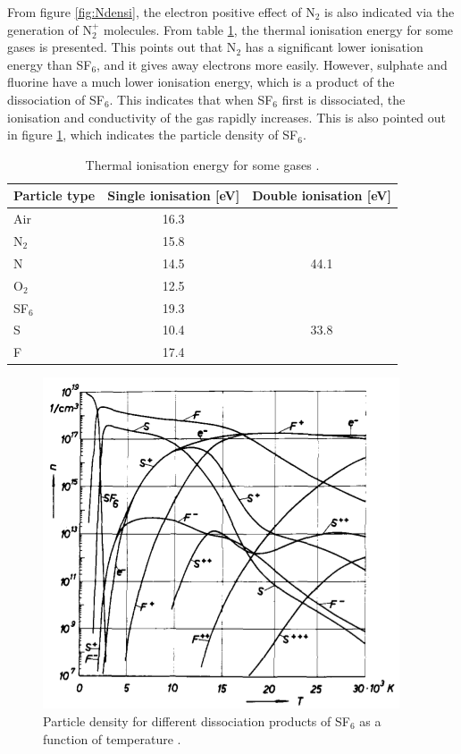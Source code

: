\documentclass[10pt,a4paper,twoside]{article}
\begin{document}
From figure \ref{fig:Ndensi}, the electron positive effect of N$_2$ is also indicated via the generation of N$_{2}^{+}$ molecules. From table \ref{tab:thermalIonisation}, the thermal ionisation energy for some gases is presented. This points out that N$_2$ has a significant lower ionisation energy than SF$_6$, and it gives away electrons more easily. However, sulphate and fluorine have a much lower ionisation energy, which is a product of the dissociation of SF$_6$. This indicates that when SF$_6$ first is dissociated, the ionisation and conductivity of the gas rapidly increases. This is also pointed out in figure \ref{fig:SF6densi}, which indicates the particle density of SF$_6$.

\begin{table}[H]
\center
\caption{Thermal ionisation energy for some gases \cite{bib:HVEbreak}.}
\begin{tabular}{|l|c|c|}
\hline 
Particle type & Single ionisation [eV] & Double ionisation [eV] \\ 
\hline 
Air & 16.3 &  \\ 
\hline 
N$_2$ & 15.8 &  \\ 
\hline 
N & 14.5 & 44.1 \\ 
\hline 
O$_2$ & 12.5 &  \\ 
\hline 
SF$_6$ & 19.3 &  \\ 
\hline 
S & 10.4 & 33.8 \\ 
\hline 
F & 17.4 &  \\ 
\hline 
\end{tabular} 
\label{tab:thermalIonisation}
\end{table}

\begin{figure}[H]
\centering
\includegraphics[scale=0.5]{Bilder/Theory/particleDensSF6.png}
\caption{Particle density for different dissociation products of SF$_6$ as a function of temperature \cite{bib:IPSF6AQM}.} \label{fig:SF6densi}
\end{figure}
\end{document}
